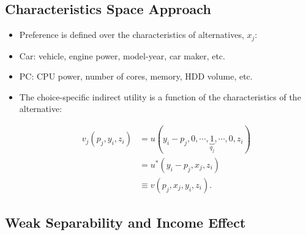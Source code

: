 \documentclass[]{book}
\begin{document}
\subsection{Characteristics Space
Approach}\label{characteristics-space-approach}

\begin{itemize}
\item
  Preference is defined over the characteristics of alternatives,
  \(x_j\):
\item
  Car: vehicle, engine power, model-year, car maker, etc.
\item
  PC: CPU power, number of cores, memory, HDD volume, etc.
\item
  The choice-specific indirect utility is a function of the
  characteristics of the alternative:

  \begin{equation}
  \begin{split}
  v_j(p_j, y_i, z_i) &=u(y_i - p_j, 0, \cdots, \underbrace{1}_{q_j}, \cdots, 0, z_i)\\
  &= u^*(y_i - p_j, x_j, z_i)\\
  &\equiv v(p_j, x_j, y_i, z_i).
  \end{split}
  \end{equation}
\end{itemize}

\subsection{Weak Separability and Income
Effect}\label{weak-separability-and-income-effect}
\end{document}
